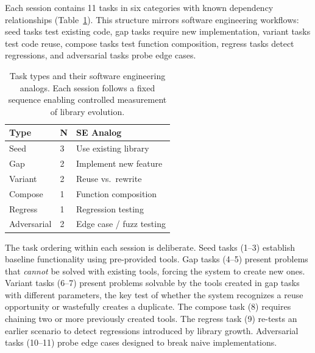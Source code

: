 \documentclass[sigplan,nonacm,natbib=false]{acmart}
\begin{document}
Each session contains 11 tasks in six categories with known dependency relationships (Table~\ref{tab:task_types}). This structure mirrors software engineering workflows: seed tasks test existing code, gap tasks require new implementation, variant tasks test code reuse, compose tasks test function composition, regress tasks detect regressions, and adversarial tasks probe edge cases.

\begin{table}[t]
\centering
\footnotesize
\begin{tabular}{llp{3.2cm}}
\toprule
\textbf{Type} & \textbf{N} & \textbf{SE Analog} \\
\midrule
Seed & 3 & Use existing library \\
Gap & 2 & Implement new feature \\
Variant & 2 & Reuse vs.\ rewrite \\
Compose & 1 & Function composition \\
Regress & 1 & Regression testing \\
Adversarial & 2 & Edge case / fuzz testing \\
\bottomrule
\end{tabular}
\caption{Task types and their software engineering analogs. Each session follows a fixed sequence enabling controlled measurement of library evolution.}
\label{tab:task_types}
\end{table}

The task ordering within each session is deliberate. Seed tasks (1--3) establish baseline functionality using pre-provided tools. Gap tasks (4--5) present problems that \emph{cannot} be solved with existing tools, forcing the system to create new ones. Variant tasks (6--7) present problems solvable by the tools created in gap tasks with different parameters, the key test of whether the system recognizes a reuse opportunity or wastefully creates a duplicate. The compose task (8) requires chaining two or more previously created tools. The regress task (9) re-tests an earlier scenario to detect regressions introduced by library growth. Adversarial tasks (10--11) probe edge cases designed to break naive implementations.
\end{document}

